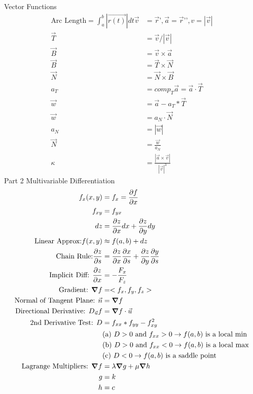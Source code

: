 \documentclass[12pt]{article}
\newcommand{\gv}[1]{\ensuremath{\mbox{\boldmath$ #1 $}}}
\newcommand{\grad}[1]{\gv{\nabla} #1} %
\renewcommand{\=}[1]{\stackrel{#1}{=}} %
\theoremstyle{definition}
\theoremstyle{remark}
\begin{document}
Vector Functions
\begin{align*}
  \textrm{Arc Length} = \int_{a}^b|\vec {r(t)}| dt  
  \vec v &= \vec r’ , \vec a = \vec r’’ , v = |\vec v|\\
  \vec T &=\vec v/|\vec v|\\
  \vec B &= \vec v \times \vec a\\
  \vec B &= \vec T \times \vec N\\
  \vec N &= \vec N \times \vec B\\
  a_T &= comp_T \vec a = \vec a \cdot \vec T\\
  \vec w &= \vec a − a_T* \vec T \\
  \vec w &= a_N·\vec N\\
  a_N &= |\vec w|\\
  \vec N &=\frac{\vec w}{a_N} \\
  \kappa &= \frac{|\vec a \times \vec v |}{|\vec v|^3}
\end{align*}
Part 2
Multivariable Differentiation
\begin{align*}
  f_x(x,y) &= f_x = \frac{\partial f}{\partial x}\\ 
  f_{xy} &= f_{yx} \\
  dz &= \frac{\partial z}{\partial x}dx + \frac{\partial z}{\partial y}dy\\
  \textrm{Linear Approx:} f(x,y) &\approx f(a,b) + dz\\
  \textrm{Chain Rule:}
  \frac{\partial z}{\partial s} &=
  \frac{\partial z}{\partial x}\frac{\partial x}{\partial s} +
  \frac{\partial z}{\partial y}\frac{\partial y}{\partial s}\\
  \textrm{Implicit Diff: } \frac{\partial z}{\partial x} &=
  -\frac{F_x}{F_z}\\
  \textrm{Gradient: } \grad f &= <f_x,f_y,f_z>\\
  \textrm{Normal of Tangent Plane: }\vec n &= \grad {f}\\
  \textrm{Directional Derivative: } D_{\vec u} f &= \grad{f} \cdot \vec u \\
  \textrm{2nd Derivative Test: } D &= f_{xx}*f_{yy} - f_{xy}^2\\
  &\textrm{(a) } D > 0 \textrm{ and } f_{xx} > 0 \rightarrow f(a,b)
  \textrm{ is
    a local min}\\
  &\textrm{(b) } D > 0 \textrm{ and } f_{xx} < 0 \rightarrow f(a,b)
  \textrm{ is
    a local max}\\
  &\textrm{(c) } D < 0 \rightarrow f(a,b)
  \textrm{ is
    a saddle point}\\
  \textrm{Lagrange Multipliers: } \grad f &= \lambda \grad g + \mu
  \grad h\\
  g &= k\\
  h &= c
\end{align*}
\end{document}
